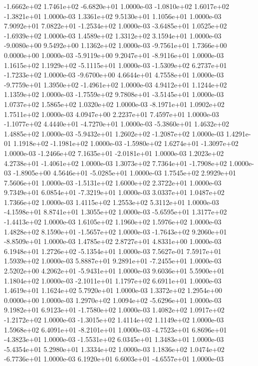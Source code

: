 -1.6662e+02  1.7461e+02 -6.6820e+01  1.0000e-03
-1.0810e+02  1.6017e+02 -1.3821e+01  1.0000e-03
1.3361e+02 9.5130e+01 1.1056e+01  1.0000e-03
 7.9092e+01  7.0822e+01 -1.2534e+02  1.0000e-03
-3.6485e+01  1.0525e+02 -1.6939e+02  1.0000e-03
1.4589e+02 1.3312e+02 3.1594e+01  1.0000e-03
-9.0080e+00  9.5492e+00  1.1362e+02  1.0000e-03
-9.7561e+01  1.7366e+00  0.0000e+00  1.0000e-03
-5.9119e+00  9.2047e+01 -8.9116e+01  1.0000e-03
 1.1615e+02  1.1929e+02 -5.1115e+01  1.0000e-03
-1.5309e+02  6.2737e+01 -1.7233e+02  1.0000e-03
-9.6700e+00  4.6644e+01  4.7558e+01  1.0000e-03
-9.7759e+01  1.3950e+02 -1.4961e+02  1.0000e-03
4.9412e+01 1.1244e+02 1.1359e+02  1.0000e-03
-1.7559e+02  9.7808e+01 -3.5145e+01  1.0000e-03
1.0737e+02 1.5865e+02 1.0320e+02  1.0000e-03
-8.1971e+01  1.0902e+02  1.7511e+02  1.0000e-03
4.0947e+00 2.2237e+01 7.4597e+01  1.0000e-03
-1.1077e+02  4.4440e+01 -4.7270e+01  1.0000e-03
-5.3860e+01  1.4632e+02  1.4885e+02  1.0000e-03
-5.9432e+01  1.2602e+02 -1.2087e+02  1.0000e-03
 1.4291e-01  1.1918e+02 -1.1981e+02  1.0000e-03
-1.5980e+02  1.6274e+01 -1.3097e+02  1.0000e-03
-1.2466e+02  7.1635e+01 -2.0181e+01  1.0000e-03
 1.2023e+02  4.2738e+01 -1.4061e+02  1.0000e-03
 1.3073e+02  7.7364e+01 -1.7908e+02  1.0000e-03
-1.8905e+00  4.5646e+01 -5.0285e+01  1.0000e-03
1.7545e+02 2.9929e+01 7.5606e+01  1.0000e-03
-1.5131e+02  1.6000e+02  2.3722e+01  1.0000e-03
 9.7349e+01  6.0854e+01 -7.3219e+01  1.0000e-03
3.0337e+01 1.0487e+02 1.7366e+02  1.0000e-03
1.4115e+02 1.2553e+02 5.3112e+01  1.0000e-03
-4.1598e+01  8.8741e+01  1.3055e+02  1.0000e-03
-5.6595e+01  1.3177e+02 -1.4413e+02  1.0000e-03
1.6105e+02 1.1960e+02 1.5976e+02  1.0000e-03
 1.4828e+02  8.1590e+01 -1.5657e+02  1.0000e-03
-1.7643e+02  9.2060e+01 -8.8509e+01  1.0000e-03
1.4785e+02 2.8727e+01 4.8331e+00  1.0000e-03
 6.1948e+01  1.2726e+02 -5.1354e+01  1.0000e-03
7.5627e-01 7.5917e+01 1.5939e+02  1.0000e-03
 5.8887e+01  9.2891e+01 -7.2455e+01  1.0000e-03
 2.5202e+00  4.2062e+01 -5.9431e+01  1.0000e-03
9.6036e+01 5.5900e+01 1.1804e+02  1.0000e-03
-2.1011e+01  1.1797e+02  6.6911e+01  1.0000e-03
1.4619e+01 1.1624e+02 5.7920e+01  1.0000e-03
1.3372e+02 1.2954e+00 0.0000e+00  1.0000e-03
 1.2970e+02  1.0094e+02 -5.6296e+01  1.0000e-03
 9.1982e+01  6.9123e+01 -1.7580e+02  1.0000e-03
 1.4082e+02  1.0917e+02 -1.2172e+02  1.0000e-03
-1.3015e+02  1.4114e+02  1.1149e+02  1.0000e-03
 1.5968e+02  6.4091e+01 -8.2101e+01  1.0000e-03
-4.7523e+01  6.8696e+01 -4.3823e+01  1.0000e-03
-1.5531e+02  6.0345e+01  1.3483e+01  1.0000e-03
-5.4354e+01  5.2980e+01  1.3334e+02  1.0000e-03
 1.1836e+02  1.0474e+02 -6.7736e+01  1.0000e-03
 6.1920e+01  6.6003e+01 -4.6557e+01  1.0000e-03
